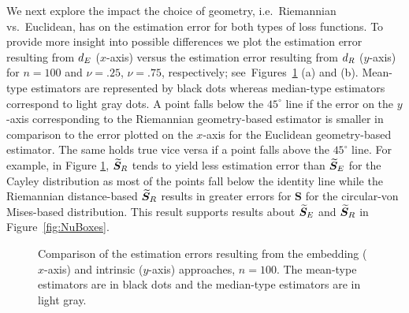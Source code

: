 We next explore the impact the choice of geometry, i.e.~Riemannian vs.~Euclidean, has on the estimation error for both types of loss functions. To provide more insight into possible differences we plot the estimation error resulting from ${d_E}$ ($x$-axis) versus the estimation error resulting from ${d_R}$ ($y$-axis) for $n=100$ and $\nu=.25$,  $\nu=.75$, respectively; see~Figures~\ref{fig:comPL2} (a) and (b).   
Mean-type estimators are represented by black dots whereas median-type estimators correspond to light gray dots. A point falls below the $45^\circ{}$ line if the error on the $y$-axis corresponding to the Riemannian geometry-based estimator is smaller in comparison to the error plotted on the $x$-axis for the Euclidean geometry-based estimator.  The same holds true vice versa if a point falls above the $45^\circ{}$ line. 
For example, in Figure \ref{fig:comPL2},  ${\widetilde{\bm S}_R}$ tends to yield less estimation error than ${\widetilde{\bm S}_E}$  for the Cayley distribution as most of the points fall below the identity line while the Riemannian distance-based ${\widetilde{\bm S}_R}$ results in greater errors for ${\bm S}$ for the circular-von Mises-based distribution.  This result supports results about ${\widetilde{\bm S}_E}$ and ${\widetilde{\bm S}_R}$ in Figure~\ref{fig:NuBoxes}.

\begin{figure}[h!]
\centering
{}\newline
{}
\caption{Comparison of the estimation errors resulting from the embedding ($x$-axis) and intrinsic ($y$-axis) approaches, $n=100$.  The mean-type estimators are in black dots and the median-type estimators are in light gray.}
\label{fig:comPL2}
\end{figure}

